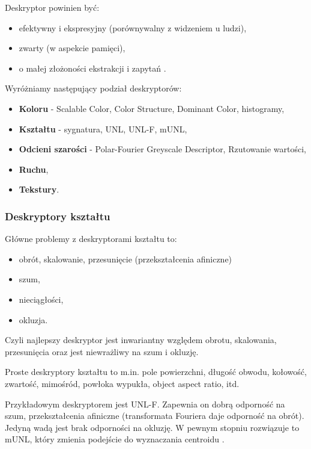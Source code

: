\documentclass[wi]{zut}
\begin{document}
Deskryptor powinien być:

\begin{itemize}
    \item efektywny i ekspresyjny (porównywalny z widzeniem u ludzi),
    \item zwarty (w aspekcie pamięci),
    \item o małej złożoności ekstrakcji i zapytań \cite{Frejlichowski2020}.
\end{itemize}

Wyróżniamy następujący podział deskryptorów:

\begin{itemize}
    \item \textbf{Koloru} - Scalable Color, Color Structure, Dominant Color, histogramy,
    \item \textbf{Kształtu} - sygnatura, UNL, UNL-F, mUNL,
    \item \textbf{Odcieni szarości} - Polar-Fourier Greyscale Descriptor, Rzutowanie wartości,
    \item \textbf{Ruchu},
    \item \textbf{Tekstury}.
\end{itemize}

\subsubsection{Deskryptory kształtu}

Główne problemy z deskryptorami kształtu to:

\begin{itemize}
    \item obrót, skalowanie, przesunięcie (przekształcenia afiniczne)
    \item szum,
    \item nieciągłości,
    \item okluzja.
\end{itemize}

Czyli najlepszy deskryptor jest inwariantny względem obrotu, skalowania, przesunięcia oraz jest niewrażliwy na szum i okluzję.

Proste deskryptory kształtu to m.in. pole powierzchni, długość obwodu, kołowość, zwartość, mimośród, powłoka wypukła, object aspect ratio, itd. \cite{Frejlichowski2020_2}

Przykładowym deskryptorem jest UNL-F. Zapewnia on dobrą odporność na szum, przekształcenia afiniczne (transformata Fouriera daje odporność na obrót). Jedyną wadą jest brak odporności na okluzję. W pewnym stopniu rozwiązuje to mUNL, który zmienia podejście do wyznaczania centroidu  \cite{Frejlichowski2020_2}.
\end{document}
